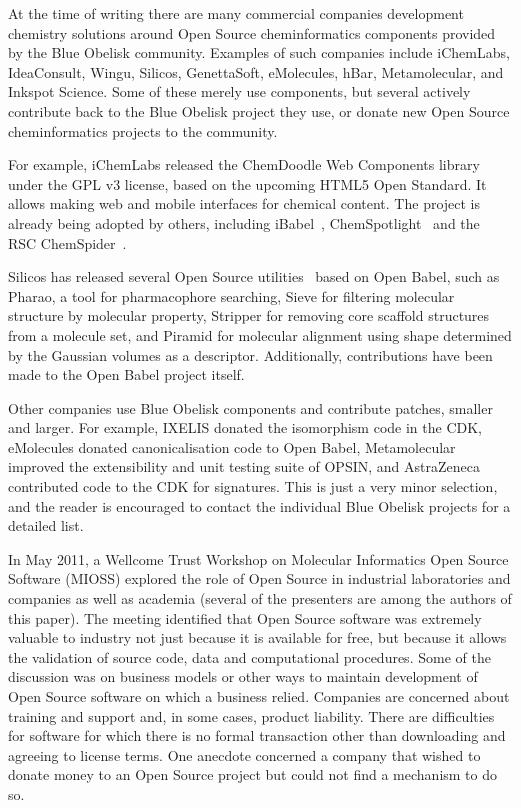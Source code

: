 \documentclass[10pt]{bmc_article}
\newenvironment{bmcformat}{\fussy\setboolean{publ}{true}}{\fussy}
\begin{document}
\begin{bmcformat}
At the time of writing there are many commercial companies development chemistry
solutions around Open Source cheminformatics components provided by the Blue Obelisk
community. Examples of such companies include iChemLabs, IdeaConsult, Wingu, Silicos,
GenettaSoft, eMolecules, hBar, Metamolecular, and Inkspot Science. Some of these merely use components, but several
actively contribute back to the Blue Obelisk project they use, or donate new
Open Source cheminformatics projects to the community.

For example, iChemLabs released the ChemDoodle Web Components library under the GPL v3
license, based on the upcoming HTML5 Open Standard. It allows making web and mobile
interfaces for chemical content. The project is already being adopted by others,
including iBabel~\cite{iBabel}, ChemSpotlight~\cite{chemspotlight} and the RSC ChemSpider~\cite{chemspider_chemdoodle}.

Silicos has released several Open Source utilities~\cite{SilicosDownloads} based on
Open Babel, such as Pharao, a tool for pharmacophore searching,
Sieve for filtering molecular structure by molecular property,
Stripper for removing core scaffold structures from a molecule
set, and Piramid for molecular alignment using shape determined
by the Gaussian volumes as a descriptor. Additionally,
contributions have been made to the Open Babel project itself.

Other companies use Blue Obelisk components and contribute patches,
smaller and larger. For example, IXELIS donated the isomorphism
code in the CDK, eMolecules donated canonicalisation code to
Open Babel, Metamolecular improved the extensibility and unit testing suite of OPSIN,
and AstraZeneca contributed code to the CDK for
signatures. This is just a very minor selection, and the reader
is encouraged to contact the individual Blue Obelisk projects
for a detailed list.

In May 2011, a Wellcome Trust Workshop on
Molecular Informatics Open Source Software (MIOSS) explored the role of
Open Source in industrial laboratories and companies as well as
academia (several of
the presenters are among the authors of this paper).
The meeting identified that Open Source software was extremely valuable to
industry not just because it is available for free,
but because it allows the validation of source code, data and
computational procedures. Some 
of the discussion was on business models or other ways to maintain 
development of Open Source software on which a business relied.
Companies are concerned about training and support
and, in some cases, product liability.  There are difficulties
for software for which there is no formal
transaction other than downloading and agreeing to license terms.
One anecdote concerned a company
that wished to donate money to an Open Source
project but could not find a mechanism to do so.


\end{bmcformat}
\end{document}
